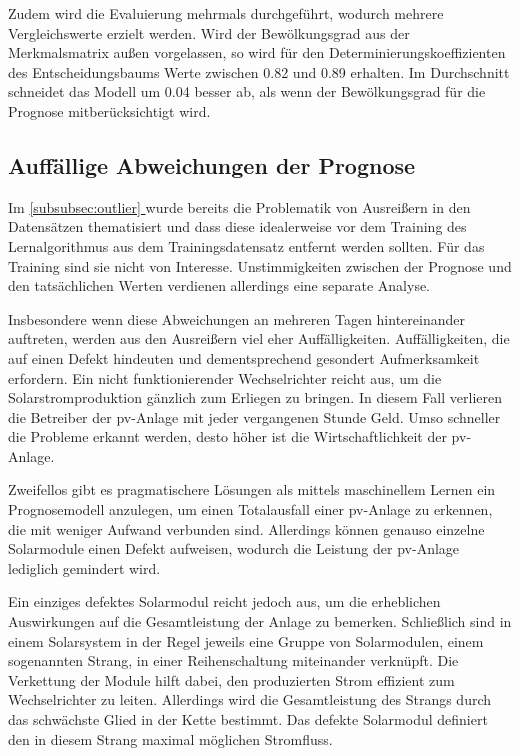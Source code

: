 \documentclass[12pt, a4paper]{article}
\newcommand*{\fullref}[1]{\hyperref[{#1}]{\autoref*{#1} \textit{\nameref*{#1}}}}
\begin{document}
Zudem wird die Evaluierung mehrmals durchgeführt, wodurch mehrere Vergleichswerte erzielt werden. Wird der Bewölkungsgrad aus der Merkmalsmatrix außen vorgelassen, so wird für den Determinierungskoeffizienten des Entscheidungsbaums Werte zwischen 0.82 und 0.89 erhalten. Im Durchschnitt schneidet das Modell um 0.04 besser ab, als wenn der Bewölkungsgrad für die Prognose mitberücksichtigt wird. 

\subsection{Auffällige Abweichungen der Prognose}

Im \fullref{subsubsec:outlier} wurde bereits die Problematik von Ausreißern in den Datensätzen thematisiert und dass diese idealerweise vor dem Training des Lernalgorithmus aus dem Trainingsdatensatz entfernt werden sollten. Für das Training sind sie nicht von Interesse. Unstimmigkeiten zwischen der Prognose und den tatsächlichen Werten verdienen allerdings eine separate Analyse.

Insbesondere wenn diese Abweichungen an mehreren Tagen hintereinander auftreten, werden aus den Ausreißern viel eher Auffälligkeiten. Auffälligkeiten, die auf einen Defekt hindeuten und dementsprechend gesondert Aufmerksamkeit erfordern. Ein nicht funktionierender Wechselrichter reicht aus, um die Solarstromproduktion gänzlich zum Erliegen zu bringen. In diesem Fall verlieren die Betreiber der \ac{pv}-Anlage mit jeder vergangenen Stunde Geld. Umso schneller die Probleme erkannt werden, desto höher ist die Wirtschaftlichkeit der \ac{pv}-Anlage.

Zweifellos gibt es pragmatischere Lösungen als mittels maschinellem Lernen ein Prognosemodell anzulegen, um einen Totalausfall einer \ac{pv}-Anlage zu erkennen, die mit weniger Aufwand verbunden sind. Allerdings können genauso einzelne Solarmodule einen Defekt aufweisen, wodurch die Leistung der \ac{pv}-Anlage lediglich gemindert wird. 

Ein einziges defektes Solarmodul reicht jedoch aus, um die erheblichen Auswirkungen auf die Gesamtleistung der Anlage zu bemerken. Schließlich sind in einem Solarsystem in der Regel jeweils eine Gruppe von Solarmodulen, einem sogenannten Strang, in einer Reihenschaltung miteinander verknüpft. Die Verkettung der Module hilft dabei, den produzierten Strom effizient zum Wechselrichter zu leiten. Allerdings wird die Gesamtleistung des Strangs durch das schwächste Glied in der Kette bestimmt. Das defekte Solarmodul definiert den in diesem Strang maximal möglichen Stromfluss.
\end{document}
